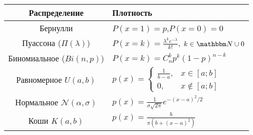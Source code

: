 \documentclass[12pt, timbord]{../../notes}
\begin{document}
{\everymath{\displaystyle}
  \begin{tabulary}{1.0\textwidth}{|C|L|}
  \hline
  \bf Распределение & \bf Плотность \\ \hline
  Бернулли & $P(x=1) = p$,$P(x=0)=0$\\
  Пуассона ($\Pi(\lambda)$) & $P(x=k) = \frac{\lambda^k e^{-\lambda}}{k!}$, $k\in \N \cup {0}$ \\
  Биномиальное ($Bi(n,p)$) & $P(x=k) = C_n^k p^k(1-p)^{n-k}$ \\ \hline
  Равномерное $U (a,b)$ & $ p(x)=\begin{cases}
    \frac{1}{b-a}, & x\in [a;b] \\
    0, & x\not\in [a;b]
  \end{cases} $ \\
  Нормальное $\mathcal N (\alpha, \sigma)$ & $p(x)=\frac{1}{\sigma \sqrt{2\pi}} e^{-(x-a)^2/2}$ \\
  Коши $K (a,b)$ & $p(x)=\frac{b}{\pi(b+(x-a)^2)}$ \\
  
  
  \hline


\end{tabulary}
}
\end{document}
